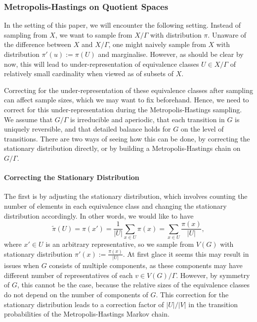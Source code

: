 \documentclass{article}
\theoremstyle{definition}
\begin{document}
\subsubsection{Metropolis-Hastings on Quotient Spaces}
In the setting of this paper, we will encounter the following setting. Instead of sampling from $X$, we want to sample from $X/\Gamma$ with distribution $\pi$. Unaware of the difference between $X$ and $X/\Gamma$, one might naively sample from $X$ with distribution $\pi'(u):= \pi(U)$ and marginalise. However, as should be clear by now, this will lead to under-representation of equivalence classes $U\in X/\Gamma$ of relatively small cardinality when viewed as of subsets of $X$.

Correcting for the under-representation of these equivalence classes after sampling can affect sample sizes, which we may want to fix beforehand. Hence, we need to correct for this under-representation during the Metropolis-Hastings sampling. We assume that $G/\Gamma$ is irreducible and aperiodic, that each transition in $G$ is uniquely reversible, and that detailed balance holds for $G$ on the level of transitions. There are two ways of seeing how this can be done, by correcting the stationary distribution directly, or by building a Metropolis-Hastings chain on $G/\Gamma$.

\paragraph{Correcting the Stationary Distribution} 
The first is by adjusting the stationary distribution, which involves counting the number of elements in each equivalence class and changing the stationary distribution accordingly. In other words, we would like to have 
\[
   \widetilde{\pi}(U) = \pi(x') = \frac{1}{|U|}\sum_{x\in U}\pi(x) = \sum_{x\in U}\frac{\pi(x)}{|U|},
\]
where $x'\in U$ is an arbitrary representative, so we sample from $V(G)$ with stationary distribution $\pi'(x):= \frac{\pi(x)}{|U|}$. At first glace it seems this may result in issues when $G$ consists of multiple components, as these components may have different number of representatives of each $v\in V(G)/\Gamma$. However, by symmetry of $G$, this cannot be the case, because the relative sizes of the equivalence classes do not depend on the number of components of $G$. This correction for the stationary distribution leads to a correction factor of $|U|/|V|$ in the transition probabilities of the Metropolis-Hastings Markov chain.
\end{document}
